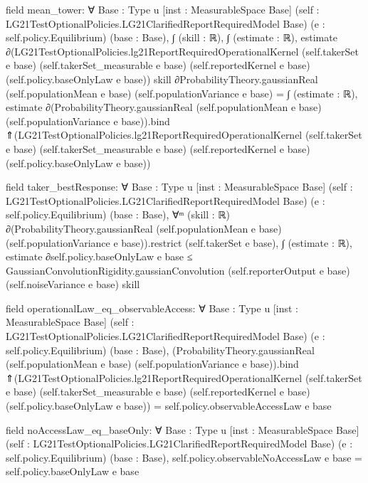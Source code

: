 \documentclass[10pt]{article}
\begin{document}
\begin{ReviewVerbatim}
field mean_tower:
∀ {Base : Type u} [inst : MeasurableSpace Base] (self : LG21TestOptionalPolicies.LG21ClarifiedReportRequiredModel Base)
  (e : self.policy.Equilibrium) (base : Base),
  ∫ (skill : ℝ),
      ∫ (estimate : ℝ),
        estimate ∂(LG21TestOptionalPolicies.lg21ReportRequiredOperationalKernel (self.takerSet e base)
            (self.takerSet_measurable e base) (self.reportedKernel e base) (self.policy.baseOnlyLaw e base))
          skill ∂ProbabilityTheory.gaussianReal (self.populationMean e base) (self.populationVariance e base) =
    ∫ (estimate : ℝ),
      estimate ∂(ProbabilityTheory.gaussianReal (self.populationMean e base) (self.populationVariance e base)).bind
        ⇑(LG21TestOptionalPolicies.lg21ReportRequiredOperationalKernel (self.takerSet e base)
            (self.takerSet_measurable e base) (self.reportedKernel e base) (self.policy.baseOnlyLaw e base))

field taker_bestResponse:
∀ {Base : Type u} [inst : MeasurableSpace Base] (self : LG21TestOptionalPolicies.LG21ClarifiedReportRequiredModel Base)
  (e : self.policy.Equilibrium) (base : Base),
  ∀ᵐ (skill :
    ℝ) ∂(ProbabilityTheory.gaussianReal (self.populationMean e base) (self.populationVariance e base)).restrict
      (self.takerSet e base),
    ∫ (estimate : ℝ), estimate ∂self.policy.baseOnlyLaw e base ≤
      GaussianConvolutionRigidity.gaussianConvolution (self.reporterOutput e base) (self.noiseVariance e base) skill

field operationalLaw_eq_observableAccess:
∀ {Base : Type u} [inst : MeasurableSpace Base] (self : LG21TestOptionalPolicies.LG21ClarifiedReportRequiredModel Base)
  (e : self.policy.Equilibrium) (base : Base),
  (ProbabilityTheory.gaussianReal (self.populationMean e base) (self.populationVariance e base)).bind
      ⇑(LG21TestOptionalPolicies.lg21ReportRequiredOperationalKernel (self.takerSet e base)
          (self.takerSet_measurable e base) (self.reportedKernel e base) (self.policy.baseOnlyLaw e base)) =
    self.policy.observableAccessLaw e base

field noAccessLaw_eq_baseOnly:
∀ {Base : Type u} [inst : MeasurableSpace Base] (self : LG21TestOptionalPolicies.LG21ClarifiedReportRequiredModel Base)
  (e : self.policy.Equilibrium) (base : Base), self.policy.observableNoAccessLaw e base = self.policy.baseOnlyLaw e base
\end{ReviewVerbatim}
\end{document}
